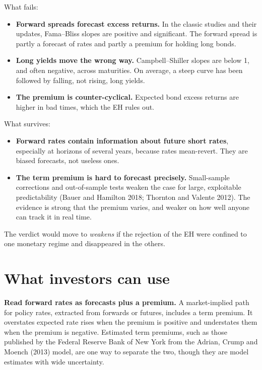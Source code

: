 What fails:

\begin{itemize}
  \item \textbf{Forward spreads forecast excess returns.} In the classic studies and their updates, Fama--Bliss slopes are positive and significant. The forward spread is partly a forecast of rates and partly a premium for holding long bonds.
  \item \textbf{Long yields move the wrong way.} Campbell--Shiller slopes are below 1, and often negative, across maturities. On average, a steep curve has been followed by falling, not rising, long yields.
  \item \textbf{The premium is counter-cyclical.} Expected bond excess returns are higher in bad times, which the EH rules out.
\end{itemize}

What survives:

\begin{itemize}
  \item \textbf{Forward rates contain information about future short rates}, especially at horizons of several years, because rates mean-revert. They are biased forecasts, not useless ones.
  \item \textbf{The term premium is hard to forecast precisely.} Small-sample corrections and out-of-sample tests weaken the case for large, exploitable predictability (Bauer and Hamilton 2018; Thornton and Valente 2012). The evidence is strong that the premium varies, and weaker on how well anyone can track it in real time.
\end{itemize}

The verdict would move to \emph{weakens} if the rejection of the EH were confined to one monetary regime and disappeared in the others.

\section{What investors can use}
\label{sec:10-investors}

\textbf{Read forward rates as forecasts plus a premium.} A market-implied path for policy rates, extracted from forwards or futures, includes a term premium. It overstates expected rate rises when the premium is positive and understates them when the premium is negative. Estimated term premiums, such as those published by the Federal Reserve Bank of New York from the Adrian, Crump and Moench (2013) model, are one way to separate the two, though they are model estimates with wide uncertainty.

